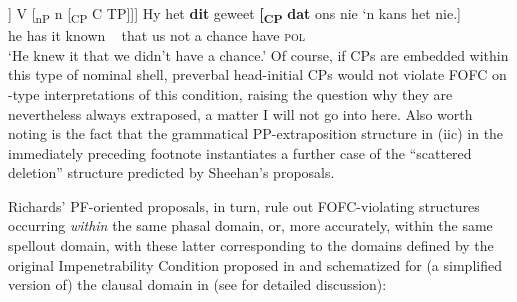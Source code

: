 \documentclass[output=paper]{LSP/langsci}
\begin{document}
{  \let\eachwordone\upshape
   \ea\upshape  [\textsubscript{VP} [\textsubscript{nP} n  [\textsubscript{CP} C TP]] V [\textsubscript{nP} n  [\textsubscript{CP} C TP]]] \ex
      \gll    Hy het \textbf{dit} geweet \textbf{[\textsubscript{CP}} \textbf{dat} ons nie ‘n  kans     het    nie.] \\
      he  has it   known  ~     that us   not  a  chance  have \textsc{pol}\\
      \glt \upshape ‘He knew it that we didn’t have a chance.’
    \z
   Of course, if CPs are embedded within this type of nominal shell, preverbal head-initial CPs would not violate FOFC on -type interpretations of this condition, raising the {question} why they are nevertheless always extraposed, a matter I will not go into here. Also worth noting is the fact that the grammatical PP-extraposition structure in (iic) in the immediately preceding footnote instantiates a further case of the “scattered deletion” structure predicted by Sheehan’s proposals.
 }\pagebreak[4]\largerpage[-1]

Richards’ PF-oriented proposals, in turn, rule out FOFC-violating structures occurring \textit{within} the same phasal domain, or, more accurately, within the same spellout domain, with these latter corresponding to the domains defined by the original  Impenetrability Condition proposed in \citet{Chomsky2000} and schematized for (a simplified version of) the clausal domain in  (see \citealt[Chapter 5]{Richards2016} for detailed discussion):

\ea%
\label{ex:biberauer:13}
\z
\end{document}
